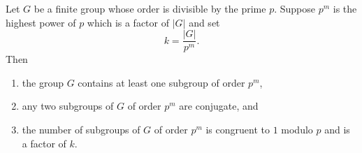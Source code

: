 \documentclass[12pt]{article}
\begin{document}
Let $G$ be a finite group whose order is divisible by the prime $p$. Suppose $p^m$ is the highest power of $p$ which is a factor of $|G|$ and set $$k = \frac{|G|}{p^m}.$$ Then

\begin{enumerate}
\item the group $G$ contains at least one subgroup of order $p^m$,
\item any two subgroups of $G$ of order $p^m$ are conjugate, and
\item the number of subgroups of $G$ of order $p^m$ is congruent to $1$ modulo $p$ and is a factor of $k$.
\end{enumerate}
\end{document}
